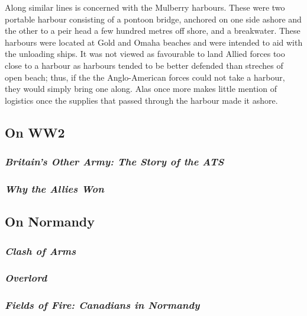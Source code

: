 \documentclass[noraggedright]{turabian-researchpaper}
\begin{document}
Along similar lines %
is concerned with the Mulberry harbours.  These were two portable harbour 
consisting of a pontoon bridge, anchored on one side ashore and the other
to a peir head a few hundred metres off shore, and a breakwater.  These
harbours were located at Gold and Omaha beaches and were intended to aid
with the unloading ships.  It was not viewed as favourable to land Allied
forces too close to a harbour as harbours tended to be better defended 
than streches of open beach; thus, if the the Anglo-American forces could
not take a harbour, they would simply bring one along.  Alas %
once more makes little mention of logistics once the supplies that passed
through the harbour made it ashore.

	\subsection{On WW2} %
		\subsubsection{\textit{Britain's Other Army:  The Story of
			the ATS}}
		\subsubsection{\textit{Why the Allies Won}}

	\subsection{On Normandy}


		\subsubsection{\textit{Clash of Arms}}
		\subsubsection{\textit{Overlord}}
		\subsubsection{\textit{Fields of Fire:  Canadians in 
			Normandy}}
\end{document}
